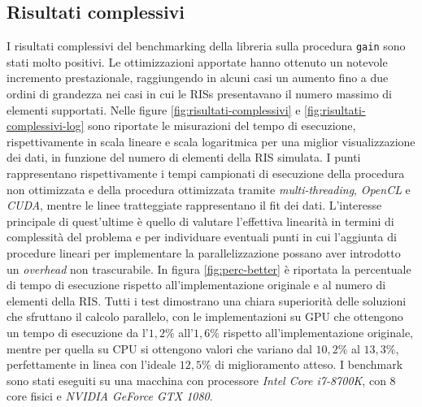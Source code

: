 \subsection{Risultati complessivi}
\label{subsec:risultati-complessivi}

I risultati complessivi del benchmarking della libreria sulla procedura \texttt{gain}
sono stati molto positivi. Le ottimizzazioni apportate hanno ottenuto un
notevole incremento prestazionale, raggiungendo in alcuni casi un aumento fino a
due ordini di grandezza nei casi in cui le RISs presentavano il numero massimo di
elementi supportati. Nelle figure \ref{fig:risultati-complessivi} e
\ref{fig:risultati-complessivi-log} sono riportate le misurazioni del tempo di
esecuzione, rispettivamente in scala lineare e scala logaritmica per una miglior
visualizzazione dei dati, in funzione del numero di elementi della RIS simulata.
I punti rappresentano rispettivamente i tempi campionati di esecuzione della procedura
non ottimizzata e della procedura ottimizzata tramite \textit{multi-threading}, \textit{OpenCL}
e \textit{CUDA}, mentre le linee tratteggiate rappresentano il fit dei dati. L'interesse
principale di quest'ultime è quello di valutare l'effettiva linearità in termini
di complessità del problema e per individuare eventuali punti in cui l'aggiunta di
procedure lineari per implementare la parallelizzazione possano aver introdotto un
\textit{overhead} non trascurabile. In figura \ref{fig:perc-better} è riportata la
percentuale di tempo di esecuzione rispetto all'implementazione originale e al
numero di elementi della RIS. Tutti i test dimostrano una chiara superiorità
delle soluzioni che sfruttano il calcolo parallelo, con le implementazioni su GPU
che ottengono un tempo di esecuzione da l'$1,2\%$ all'$1,6\%$ rispetto all'implementazione
originale, mentre per quella su CPU si ottengono valori che variano dal $10,2\%$
al $13,3\%$, perfettamente in linea con l'ideale $12,5\%$ di miglioramento atteso.
I benchmark sono stati eseguiti su una macchina con processore \textit{Intel
Core i7-8700K}, con $8$ core fisici e \textit{NVIDIA GeForce GTX 1080}.

